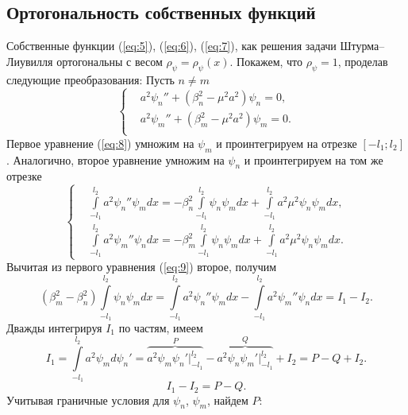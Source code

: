\documentclass[12pt, a4paper]{article}
\begin{document}
\subsection{Ортогональность собственных функций}
Собственные функции (\ref{eq:5}), (\ref{eq:6}), (\ref{eq:7}), как решения задачи Штурма--Лиувилля ортогональны с весом $\rho_\psi=\rho_\psi(x)$. Покажем, что $\rho_\psi=1$, проделав следующие преобразования:
Пусть $n \ne m$
\begin{equation}
  \left\{  
    \begin{aligned}
      & a^2 \psi_n'' + (\beta_n^2 - \mu^2 a^2) \psi_n = 0, \\
      & a^2 \psi_m'' + (\beta_m^2 - \mu^2 a^2) \psi_m = 0. \\
    \end{aligned}
  \right.
  \label{eq:8}
\end{equation}
Первое уравнение (\ref{eq:8}) умножим на $\psi_m$ и проинтегрируем на отрезке $[-l_1; l_2]$. Аналогично, второе уравнение умножим на $\psi_n$ и проинтегрируем на том же отрезке
\begin{equation}
  \left\{  
    \begin{aligned}
      & \int \limits^{l_2}_{-l_1} a^2 \psi_n'' \psi_m dx = - \beta_n^2 \int \limits^{l_2}_{-l_1} \psi_n \psi_m dx + \int \limits^{l_2}_{-l_1} a^2 \mu^2 \psi_n \psi_m dx, \\
      & \int \limits^{l_2}_{-l_1} a^2 \psi_m'' \psi_n dx = - \beta_m^2 \int \limits^{l_2}_{-l_1} \psi_n \psi_m dx + \int \limits^{l_2}_{-l_1} a^2 \mu^2 \psi_n \psi_m dx. 
    \end{aligned}
  \right.
  \label{eq:9}
\end{equation}
Вычитая из первого уравнения (\ref{eq:9}) второе, получим 
\begin{equation}
  (\beta_m^2 - \beta_n^2) \int \limits^{l_2}_{-l_1} \psi_n \psi_m dx =  \int \limits^{l_2}_{-l_1} a^2 \psi_n'' \psi_m dx -  \int \limits^{l_2}_{-l_1} a^2 \psi_m'' \psi_n dx = I_1 - I_2.
  \label{eq:11}
\end{equation}
Дважды интегрируя $I_1$ по частям, имеем
\begin{equation}
  I_1 =  \int \limits^{l_2}_{-l_1} a^2 \psi_m d \psi_n' = \overbrace{a^2 \psi_m \psi_n' \Big|^{l_2}_{-l_1}}^P - \overbrace{a^2 \psi_n \psi_m' \Big|^{l_2}_{-l_1}}^Q + I_2 = P - Q + I_2.
\end{equation}
\begin{equation}
  I_1 - I_2 = P - Q.
  \label{eq:10}
\end{equation}
Учитывая граничные условия для $\psi_n$, $\psi_m$, найдем $P$:
\end{document}
